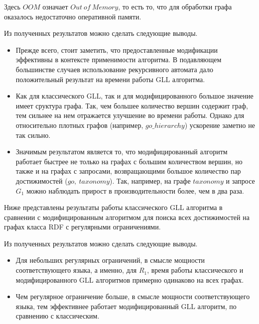 



Здесь $OOM$ означает $Out \ of \ Memory$, то есть то, что для обработки графа оказалось недостаточно оперативной памяти.

Из полученных результатов можно сделать следующие выводы.
\begin{itemize}
    \item Прежде всего, стоит заметить, что предоставленные модификации эффективны в контексте применимости алгоритма. В подавляющем большинстве случаев использование рекурсивного автомата дало положительный результат на времени работы GLL алгоритма. 
    \item Как для классического GLL, так и для модифицированного большое значение имеет сруктура графа. Так, чем большее количество вершин содержит граф, тем сильнее на нем отражается улучшение во времени работы. Однако для относительно плотных графов (например, $go\_hierarchy$) ускорение заметно не так сильно.
    \item Значимым результатом является то, что модифицированный алгоритм работает быстрее не только на графах с большим количеством вершин, но также и на графах с запросами, возвращающими большое количество пар достижимостей ($go,~taxonomy$). Так, например, на графе $taxonomy$ и запросе $G_1$ можно наблюдать прирост в производительности более, чем в два раза.
\end{itemize}

Ниже представлены результаты работы классического GLL алгоритма в сравнении с модифицированным алгоритмом для поиска всех достижимостей на графах класса RDF с регулярными ограничениями.




Из полученных результатов можно сделать следующие выводы.
\begin{itemize}
    \item Для небольших регулярных ограничений, в смысле мощности соответствующего языка, а именно, для $R_1$, время работы классического и модифицированного GLL алгоритмов примерно одинаково на всех графах.
    \item Чем регулярное ограничение больше, в смысле мощности соответствующего языка, тем эффективнее работает модифицированный GLL алгоритм, по сравнению с классическим.
\end{itemize}

